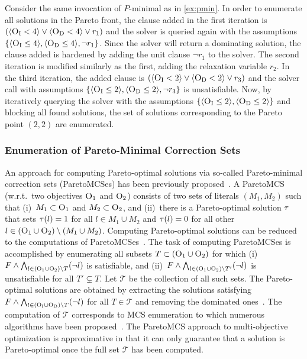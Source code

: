\begin{example}
  Consider the same invocation of $P$-minimal as in \cref{ex:pmin}.
  In order to enumerate all solutions in the Pareto front, the clause added in the first iteration is $(\langle \textsc{O}_{\text{I}} < 4 \rangle \lor \langle \textsc{O}_{\text{D}} < 4 \rangle \lor r_1)$ and the solver is queried again with the assumptions $\{ \langle \textsc{O}_{\text{I}} \leq 4 \rangle, \langle \textsc{O}_{\text{D}} \leq 4 \rangle, \lnot r_1 \}$.
  Since the solver will return a dominating solution, the clause added is hardened by adding the unit clause $\lnot r_1$ to the solver.
  The second iteration is modified similarly as the first, adding the relaxation variable $r_2$.
  In the third iteration, the added clause is $(\langle \textsc{O}_{\text{I}} < 2 \rangle \lor \langle \textsc{O}_{\text{D}} < 2 \rangle \lor r_3)$ and the solver call with assumptions $\{ \langle \textsc{O}_{\text{I}} \leq 2 \rangle, \langle \textsc{O}_{\text{D}} \leq 2 \rangle, \lnot r_3 \}$ is unsatisfiable.
  Now, by iteratively querying the solver with the assumptions $\{ \langle \textsc{O}_{\text{I}} \leq 2 \rangle, \langle \textsc{O}_{\text{D}} \leq 2 \rangle \}$ and blocking all found solutions, the set of solutions corresponding to the Pareto point $(2,2)$ are enumerated.
\end{example}

\subsubsection{Enumeration of Pareto-Minimal Correction Sets\label{sec:pareto-mcs}}

An approach for computing Pareto-optimal solutions via so-called Pareto-minimal correction sets (ParetoMCSes) has been previously proposed~\autocite{DBLP:conf/ijcai/Terra-NevesLM18a,DBLP:conf/aaai/Terra-NevesLM18,DBLP:conf/ijcai/Terra-NevesLM18}.
A ParetoMCS (w.r.t.\ two objectives $\textsc{O}_1$ and $\textsc{O}_2$) consists of two sets of literals $(M_1, M_2)$ such that (i)~$M_1 \subset \textsc{O}_1$ and $M_2 \subset \textsc{O}_2$, and (ii)~there is a Pareto-optimal solution $\tau$ that sets $\tau(l) = 1$ for all $l \in M_1 \cup M_2$ and $\tau(l) = 0$ for all other $l \in (\textsc{O}_1 \cup \textsc{O}_2) \setminus (M_1 \cup M_2)$.
Computing Pareto-optimal solutions can be reduced to the computations of ParetoMCSes~\autocite{DBLP:conf/ijcai/Terra-NevesLM18a}.
The task of computing ParetoMCSes is accomplished by enumerating all subsets $T \subset  (\textsc{O}_1 \cup \textsc{O}_2)$ for which (i)~$F \land \bigwedge_{l \in  (\textsc{O}_1 \cup \textsc{O}_2) \setminus T} (\lnot l)$ is satisfiable, and (ii)~$F \land \bigwedge_{l \in  (\textsc{O}_1 \cup \textsc{O}_2) \setminus T'} (\lnot l)$ is unsatisfiable for all $T' \subsetneq T$.
Let $\mathcal{T}$ be the collection of all such sets.
The Pareto-optimal solutions are obtained by extracting the solutions satisfying $F \land \bigwedge_{l \in  (\textsc{O}_{\text{I}} \cup \textsc{O}_{\text{D}}) \setminus T} (\lnot l)$ for all $T \in \mathcal{T}$ and removing the dominated ones~\autocite{DBLP:conf/ijcai/Terra-NevesLM18a}.
The computation of $\mathcal{T}$ corresponds to MCS enumeration to which numerous algorithms have been proposed~\autocites{DBLP:conf/lpar/BendikC20,DBLP:conf/hvc/MorgadoLM12,DBLP:conf/sat/PrevitiMJM17}.
The ParetoMCS approach to multi-objective optimization is approximative in that it can only guarantee that a solution is Pareto-optimal once the full set $\mathcal{T}$ has been computed.

